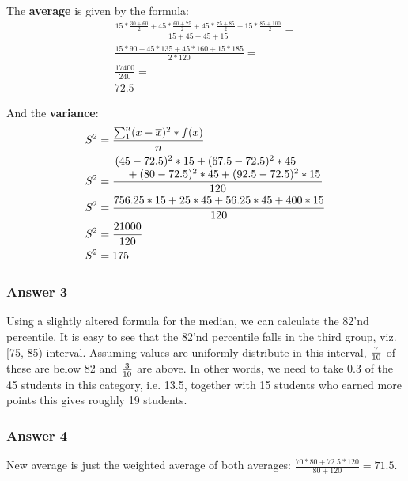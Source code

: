 \documentclass[11pt]{article}
\begin{document}
The \textbf{average} is given by the formula:
\begin{equation*}
  \begin{aligned}
    \frac{15 * \frac{30 + 60}{2} + 45 * \frac{60 + 75}{2} +
      45 * \frac{75 + 85}{2} + 15 * \frac{85 + 100}{2}}{15 + 45 + 45 + 15} = \\
    \frac{15 * 90 + 45 * 135 + 45 * 160 + 15 * 185}{2 * 120} = \\
    \frac{17400}{240} = \\72.5
  \end{aligned}
\end{equation*}

And the \textbf{variance}:
\begin{equation*}
  \begin{aligned}
    S^2 &= \frac{\sum_1^n (x - \overline{x})^2 * f(x)}{n} \\
    S^2 &= \frac{\splitfrac{(45 - 72.5)^2 * 15 + (67.5 - 72.5)^2 * 45}
      {+ (80 - 72.5)^2 * 45 + (92.5 - 72.5)^2 * 15}}{120} \\
    S^2 &= \frac{756.25 * 15 + 25 * 45 + 56.25 * 45 + 400 * 15}{120} \\
    S^2 &= \frac{21000}{120} \\
    S^2 &= 175
  \end{aligned}
\end{equation*}
\subsubsection{Answer 3}
\label{sec-1-1-3}
Using a slightly altered formula for the median, we can calculate the 82'nd
percentile.  It is easy to see that the 82'nd percentile falls in the third
group, viz. [75, 85) interval.  Assuming values are uniformly distribute
in this interval, ${7 \over 10}$ of these are below 82 and ${3 \over 10}$
are above.  In other words, we need to take 0.3 of the 45 students in this
category, i.e. 13.5, together with 15 students who earned more points this
gives roughly 19 students.
\subsubsection{Answer 4}
\label{sec-1-1-4}
New average is just the weighted average of both averages:
$\frac{70*80+72.5*120}{80+120}=71.5$.
\end{document}
